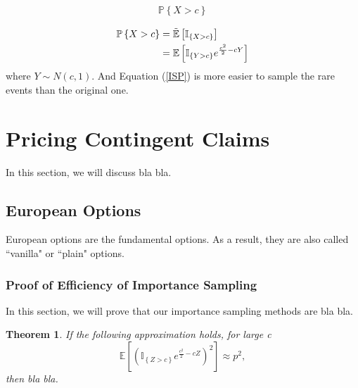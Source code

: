 \documentclass[12pt]{article}  %
\numberwithin{equation}{subsection}
\newtheorem{thm}{Theorem}[section]  %
\theoremstyle{plain}
\begin{document}
\begin{align}
\mathbb{P}\left\lbrace X>c\right\rbrace \label{MCP}
\end{align}

\begin{align}
\mathbb{P}\left\lbrace X>c\right\rbrace&=\mathbb{\tilde{E}}\left[ \mathbb{I}_{\left\lbrace X>c\right\rbrace }\right]  \notag\\
&=\mathbb{E}\left[ \mathbb{I}_{\left\lbrace Y>c\right\rbrace }e^{\frac{c^2}{2}-cY}\right] \label{ISP}
\end{align}
where $Y\sim N(c,1)$. And Equation (\ref{ISP}) is more easier to sample the rare events than the original one.


\section{Pricing Contingent Claims}
In this section, we will discuss bla bla.

\subsection{European Options}
European options are the fundamental options. As a result, they are also called ``vanilla" or ``plain" options.

\subsubsection{Proof of Efficiency of Importance Sampling}
In this section, we will prove that our importance sampling methods are bla bla.

\begin{thm}  %
If the following approximation holds, for large c
\[
\mathbb{E}\left[ \left( \mathbb{I}_{\left\lbrace Z>c\right\rbrace }e^{\frac{c^2}{2}-cZ}\right) ^2\right] \approx p^2,
\]
then bla bla.
\end{thm}
\end{document}

